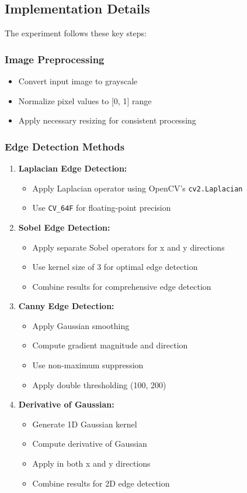 \documentclass[12pt,a4paper]{article}
\begin{document}
\subsection{Implementation Details}
The experiment follows these key steps:

\subsubsection{Image Preprocessing}
\begin{itemize}
  \item Convert input image to grayscale
  \item Normalize pixel values to [0, 1] range
  \item Apply necessary resizing for consistent processing
\end{itemize}

\subsubsection{Edge Detection Methods}
\begin{enumerate}
  \item \textbf{Laplacian Edge Detection:}
    \begin{itemize}
      \item Apply Laplacian operator using OpenCV's \texttt{cv2.Laplacian}
      \item Use \texttt{CV\_64F} for floating-point precision
    \end{itemize}

  \item \textbf{Sobel Edge Detection:}
    \begin{itemize}
      \item Apply separate Sobel operators for x and y directions
      \item Use kernel size of 3 for optimal edge detection
      \item Combine results for comprehensive edge detection
    \end{itemize}

  \item \textbf{Canny Edge Detection:}
    \begin{itemize}
      \item Apply Gaussian smoothing
      \item Compute gradient magnitude and direction
      \item Use non-maximum suppression
      \item Apply double thresholding (100, 200)
    \end{itemize}

  \item \textbf{Derivative of Gaussian:}
    \begin{itemize}
      \item Generate 1D Gaussian kernel
      \item Compute derivative of Gaussian
      \item Apply in both x and y directions
      \item Combine results for 2D edge detection
    \end{itemize}
\end{enumerate}
\end{document}
